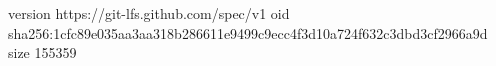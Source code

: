 version https://git-lfs.github.com/spec/v1
oid sha256:1cfc89e035aa3aa318b286611e9499c9ecc4f3d10a724f632c3dbd3cf2966a9d
size 155359
